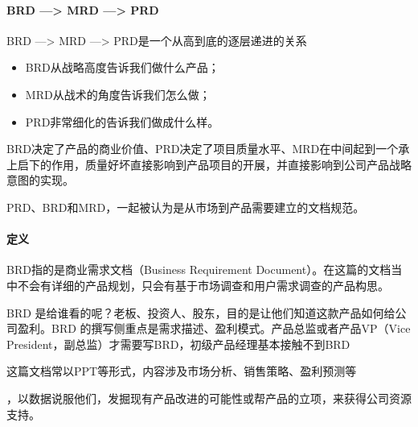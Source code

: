 \documentclass[letterpaper,11pt,english]{sphinxmanual}
\begin{document}
\paragraph{BRD —> MRD —> PRD}
\label{\detokenize{chapter_knowledge/BRD:brd-mrd-prd}}
BRD —> MRD —> PRD是一个从高到底的逐层递进的关系
%
\begin{footnote}[407]\sphinxAtStartFootnote
{}
%
\end{footnote}
\begin{itemize}
\item {} 
BRD从战略高度告诉我们做什么产品；

\item {} 
MRD从战术的角度告诉我们怎么做；

\item {} 
PRD非常细化的告诉我们做成什么样。

\end{itemize}

BRD决定了产品的商业价值、PRD决定了项目质量水平、MRD在中间起到一个承上启下的作用，质量好坏直接影响到产品项目的开展，并直接影响到公司产品战略意图的实现。

PRD、BRD和MRD，一起被认为是从市场到产品需要建立的文档规范。


\paragraph{定义}
\label{\detokenize{chapter_knowledge/BRD:id1}}
BRD指的是商业需求文档（Business Requirement
Document）。在这篇的文档当中不会有详细的产品规划，只会有基于市场调查和用户需求调查的产品构思。
%
\begin{footnote}[408]\sphinxAtStartFootnote
{}
%
\end{footnote}

BRD
是给谁看的呢？老板、投资人、股东，目的是让他们知道这款产品如何给公司盈利。BRD
的撰写侧重点是需求描述、盈利模式。产品总监或者产品VP（Vice
President，副总监）才需要写BRD，初级产品经理基本接触不到BRD

这篇文档常以PPT等形式，内容涉及市场分析、销售策略、盈利预测等%
\begin{footnote}[409]\sphinxAtStartFootnote
{}
%
\end{footnote}，以数据说服他们，发掘现有产品改进的可能性或帮产品的立项，来获得公司资源支持。
\end{document}
